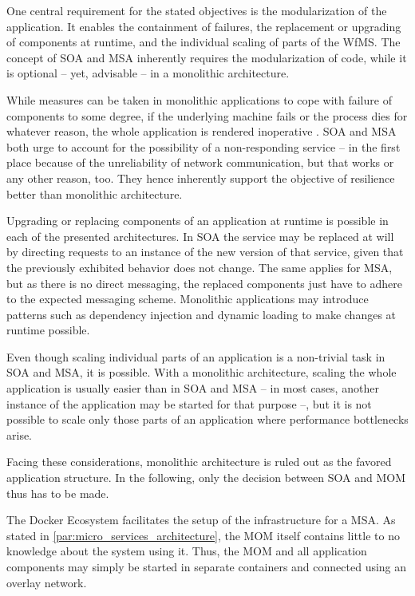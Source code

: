     One central requirement for the stated objectives is the modularization of the application. It enables the containment of failures, the replacement or upgrading of components at runtime, and the individual scaling of parts of the \ac{WfMS}. The concept of \ac{SOA} and \ac{MSA} inherently requires the modularization of code, while it is optional -- yet, advisable -- in a monolithic architecture.

    While measures can be taken in monolithic applications to cope with failure of components to some degree, if the underlying machine fails or the process dies for whatever reason, the whole application is rendered inoperative \cite[p.~55]{Newman2015Building}. \ac{SOA} and \ac{MSA} both urge to account for the possibility of a non-responding service -- in the first place because of the unreliability of network communication, but that works or any other reason, too. They hence inherently support the objective of resilience better than monolithic architecture.

    Upgrading or replacing components of an application at runtime is possible in each of the presented architectures. In \ac{SOA} the service may be replaced at will by directing requests to an instance of the new version of that service, given that the previously exhibited behavior does not change. The same applies for \ac{MSA}, but as there is no direct messaging, the replaced components just have to adhere to the expected messaging scheme. Monolithic applications may introduce patterns such as dependency injection and dynamic loading to make changes at runtime possible.

    Even though scaling individual parts of an application is a non-trivial task in \ac{SOA} and \ac{MSA}, it is possible. With a monolithic architecture, scaling the whole application is usually easier than in \ac{SOA} and \ac{MSA} -- in most cases, another instance of the application may be started for that purpose --, but it is not possible to scale only those parts of an application where performance bottlenecks arise.

    Facing these considerations, monolithic architecture is ruled out as the favored application structure. In the following, only the decision between \ac{SOA} and \ac{MOM} thus has to be made.

    The Docker Ecosystem facilitates the setup of the infrastructure for a \ac{MSA}. As stated in \ref{par:micro_services_architecture}, the \ac{MOM} itself contains little to no knowledge about the system using it. Thus, the \ac{MOM} and all application components may simply be started in separate containers and connected using an overlay network.


